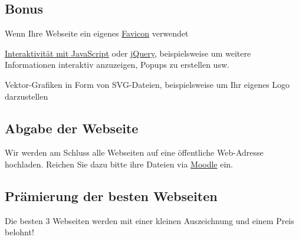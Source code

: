 \subsection*{Bonus}

\begin{todolist}
    \item Wenn Ihre Webseite ein eigenes \href{https://www.w3schools.com/html/html_favicon.asp}{Favicon} verwendet
    \item \href{https://www.w3schools.com/html/html_basic.asp}{Interaktivität mit JavaScript} oder \href{https://www.w3schools.com/jquery/default.asp}{jQuery}, beispielsweise um weitere Informationen interaktiv anzuzeigen, Popups zu erstellen usw.
    \item Vektor-Grafiken in Form von SVG-Dateien, beispielsweise um Ihr eigenes Logo darzustellen
\end{todolist}

\subsection*{Abgabe der Webseite}
Wir werden am Schluss alle Webseiten auf eine öffentliche Web-Adresse hochladen. Reichen Sie dazu bitte ihre Dateien via \href{https://moodle.ksimlee.ch/mod/assign/view.php?id=32219}{Moodle} ein.

\subsection*{Prämierung der besten Webseiten}


 Die besten 3 Webseiten werden mit einer kleinen Auszeichnung und einem Preis belohnt!
